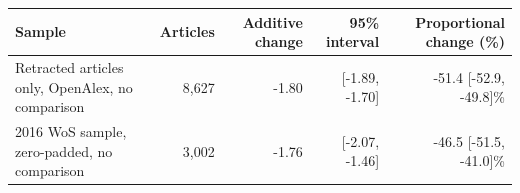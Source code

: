 
\begin{tabular}[t]{lrrrr}
\toprule
Sample & Articles & Additive change & 95\% interval & Proportional change (\%)\\
\midrule
Retracted articles only, OpenAlex, no comparison & 8,627 & -1.80 & {}[-1.89, -1.70] & -51.4 [-52.9, -49.8]\%\\
2016 WoS sample, zero-padded, no comparison & 3,002 & -1.76 & {}[-2.07, -1.46] & -46.5 [-51.5, -41.0]\%\\
\bottomrule
\end{tabular}
